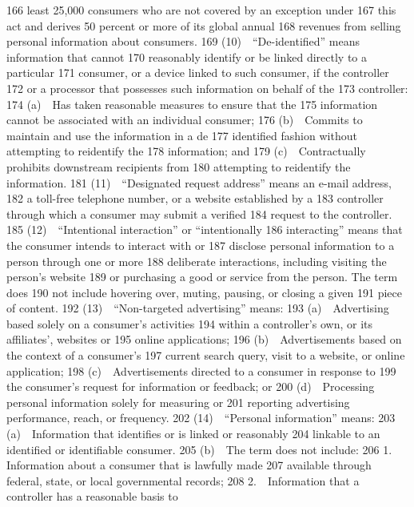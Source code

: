   166  least 25,000 consumers who are not covered by an exception under
  167  this act and derives 50 percent or more of its global annual
  168  revenues from selling personal information about consumers.
  169         (10) “De-identified” means information that cannot
  170  reasonably identify or be linked directly to a particular
  171  consumer, or a device linked to such consumer, if the controller
  172  or a processor that possesses such information on behalf of the
  173  controller:
  174         (a) Has taken reasonable measures to ensure that the
  175  information cannot be associated with an individual consumer;
  176         (b) Commits to maintain and use the information in a de
  177  identified fashion without attempting to reidentify the
  178  information; and
  179         (c) Contractually prohibits downstream recipients from
  180  attempting to reidentify the information.
  181         (11) “Designated request address” means an e-mail address,
  182  a toll-free telephone number, or a website established by a
  183  controller through which a consumer may submit a verified
  184  request to the controller.
  185         (12) “Intentional interaction” or “intentionally
  186  interacting” means that the consumer intends to interact with or
  187  disclose personal information to a person through one or more
  188  deliberate interactions, including visiting the person’s website
  189  or purchasing a good or service from the person. The term does
  190  not include hovering over, muting, pausing, or closing a given
  191  piece of content.
  192         (13) “Non-targeted advertising” means:
  193         (a) Advertising based solely on a consumer’s activities
  194  within a controller’s own, or its affiliates’, websites or
  195  online applications;
  196         (b) Advertisements based on the context of a consumer’s
  197  current search query, visit to a website, or online application;
  198         (c) Advertisements directed to a consumer in response to
  199  the consumer’s request for information or feedback; or
  200         (d) Processing personal information solely for measuring or
  201  reporting advertising performance, reach, or frequency.
  202         (14) “Personal information” means:
  203         (a) Information that identifies or is linked or reasonably
  204  linkable to an identified or identifiable consumer.
  205         (b) The term does not include:
  206         1. Information about a consumer that is lawfully made
  207  available through federal, state, or local governmental records;
  208         2. Information that a controller has a reasonable basis to
